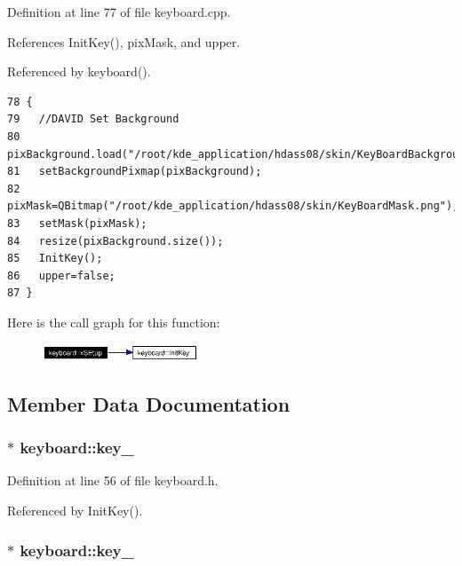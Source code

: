 Definition at line 77 of file keyboard.cpp.

References Init\-Key(), pix\-Mask, and upper.

Referenced by keyboard().



\footnotesize\begin{verbatim}78 {
79   //DAVID Set Background
80   pixBackground.load("/root/kde_application/hdass08/skin/KeyBoardBackground.png");
81   setBackgroundPixmap(pixBackground);
82   pixMask=QBitmap("/root/kde_application/hdass08/skin/KeyBoardMask.png");
83   setMask(pixMask);
84   resize(pixBackground.size());
85   InitKey();
86   upper=false;
87 }
\end{verbatim}\normalsize 


Here is the call graph for this function:\begin{figure}[H]
\begin{center}
\leavevmode
\includegraphics[width=131pt]{classkeyboard_keyboarda2_cgraph}
\end{center}
\end{figure}


\subsection{Member Data Documentation}
\subsubsection{ $\ast$ {\bf keyboard::key\_}\hspace{0.3cm}{\tt  [private]}}\label{classkeyboard_keyboardr35}




Definition at line 56 of file keyboard.h.

Referenced by Init\-Key().
\subsubsection{ $\ast$ {\bf keyboard::key\_}\hspace{0.3cm}{\tt  [private]}}\label{classkeyboard_keyboardr26}




